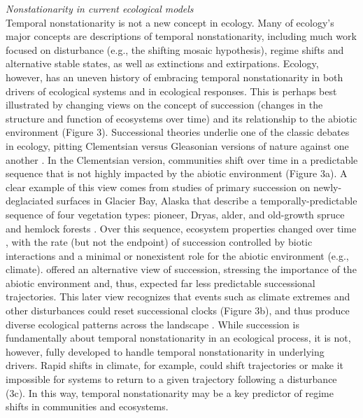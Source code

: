 \documentclass[11pt,a4paper,oneside]{article}
\begin{document}
\noindent \emph{Nonstationarity in current ecological models}\\
\noindent Temporal nonstationarity is not a new concept in ecology. Many of ecology's major concepts are descriptions of temporal nonstationarity, including much work focused on disturbance (e.g., the shifting mosaic hypothesis), regime shifts and alternative stable states, as well as extinctions and extirpations. Ecology, however, has an uneven history of embracing temporal nonstationarity in both drivers of ecological systems and in ecological responses. This is perhaps best illustrated by changing views on the concept of succession (changes in the structure and function of ecosystems over time) and its relationship to the abiotic environment (Figure 3). Successional theories underlie one of the classic debates in ecology, pitting Clementsian versus Gleasonian versions of nature against one another \citep{clementsbook,gleason1926}. In the Clementsian version, communities shift over time in a predictable sequence that is not highly impacted by the abiotic environment (Figure 3a). A clear example of this view comes from studies of primary succession on newly-deglaciated surfaces in Glacier Bay, Alaska that describe a temporally-predictable sequence of four vegetation types: pioneer, Dryas, alder, and old-growth spruce and hemlock forests \citep{cooper1923}. Over this sequence, ecosystem properties changed over time \citep{Chapin1994}, with the rate (but not the endpoint) of succession controlled by biotic interactions and a minimal or nonexistent role for the abiotic environment (e.g., climate). \citet{gleason1926} offered an alternative view of succession, stressing the importance of the abiotic environment and, thus, expected far less predictable successional trajectories. This later view recognizes that events such as climate extremes and other disturbances could reset successional clocks (Figure 3b), and thus produce diverse ecological patterns across the landscape \citep{Levin:1992rg,romme2011}. While succession is fundamentally about temporal nonstationarity in an ecological process, it is not, however, fully developed to handle temporal nonstationarity in underlying drivers. Rapid shifts in climate, for example, could shift trajectories or make it impossible for systems to return to a given trajectory following a disturbance (3c). In this way, temporal nonstationarity may be a key predictor of regime shifts in communities and ecosystems.
\end{document}
